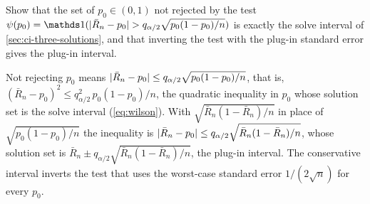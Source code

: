 \begin{exercise}
\label{ex:tests-solve-inversion}
Show that the set of $p_0 \in (0,1)$ not rejected by the test $\psi(p_0) = \ind(\abs{\bar{R}_n - p_0} > q_{\alpha/2}\sqrt{p_0(1 - p_0)/n})$ is exactly the solve interval of \cref{sec:ci-three-solutions}, and that inverting the test with the plug-in standard error gives the plug-in interval.
\end{exercise}
\begin{solution}
Not rejecting $p_0$ means $\lvert\bar{R}_n - p_0\rvert \leq q_{\alpha/2}\sqrt{p_0(1-p_0)/n}$, that is, $(\bar{R}_n - p_0)^2 \leq q_{\alpha/2}^2\, p_0(1 - p_0)/n$, the quadratic inequality in $p_0$ whose solution set is the solve interval (\cref{eq:wilson}). With $\sqrt{\bar{R}_n(1 - \bar{R}_n)/n}$ in place of $\sqrt{p_0(1-p_0)/n}$ the inequality is $\lvert\bar{R}_n - p_0\rvert \leq q_{\alpha/2}\sqrt{\bar{R}_n(1 - \bar{R}_n)/n}$, whose solution set is $\bar{R}_n \pm q_{\alpha/2}\sqrt{\bar{R}_n(1-\bar{R}_n)/n}$, the plug-in interval. The conservative interval inverts the test that uses the worst-case standard error $1/(2\sqrt{n})$ for every $p_0$.
\end{solution}
